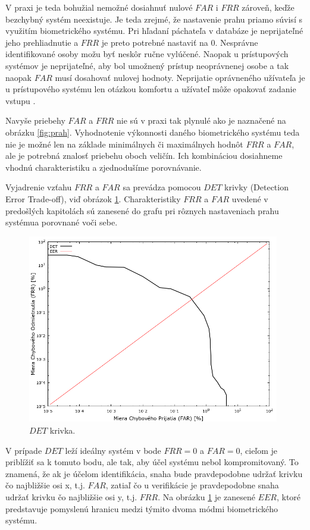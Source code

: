V praxi je teda bohužial nemožné dosiahnuť nulové $FAR$ i $FRR$ zároveň, keďže bezchybný systém neexistuje. Je teda zrejmé, že nastavenie prahu priamo súvisí s využitím biometrického systému. Pri hľadaní páchateľa v databáze je neprijateľné jeho prehliadnutie a $FRR$ je preto potrebné nastaviť na 0. Nesprávne identifikované osoby možu byť neskôr ručne vylúčené. Naopak u prístupových systémov je neprijateľné, aby bol umožnený prístup neoprávnenej osobe a tak naopak $FAR$ musí dosahovať nulovej hodnoty. Neprijatie oprávneného užívateľa je u prístupového systému len otázkou komfortu a užívateľ môže opakovať zadanie vstupu \cite{bio3}.

Navyše priebehy $FAR$ a $FRR$ nie sú v praxi tak plynulé ako je naznačené na obrázku \ref{fig:prah}. Vyhodnotenie výkonnosti daného biometrického systému teda nie je možné len na základe minimálnych či maximálnych hodnôt $FRR$ a $FAR$, ale je potrebná znalosť priebehu oboch veličín. Ich kombináciou dosiahneme vhodnú charakteristiku a zjednodušíme porovnávanie.

Vyjadrenie vzťahu $FRR$ a $FAR$ sa prevádza pomocou $DET$ krivky (Detection Error Trade-off), viď obrázok \ref{fig:det}. Charakteristiky $FRR$ a $FAR$ uvedené v predošlých kapitolách sú zanesené do grafu pri rôznych nastaveniach prahu systémua porovnané voči sebe.

\begin{figure}[!ht]
	\centering
	\includegraphics[width=11cm]{img/det.png}
	\caption{$DET$ krivka\cite{bio}.}
	\label{fig:det}
\end{figure}

V prípade $DET$ leží ideálny systém v bode $FRR = 0$ a $FAR = 0$, cieľom je priblížiť sa k tomuto bodu, ale tak, aby účel systému nebol kompromitovaný. To znamená, že ak je účelom identifikácia, snaha bude pravdepodobne udržať krivku čo najbližšie osi x, t.j. $FAR$, zatiaľ čo u verifikácie je pravdepodobne snaha udržať krivku čo najbližšie osi y, t.j. $FRR$.
Na obrázku \ref{fig:det} je zanesené $EER$, ktoré predstavuje pomyslenú hranicu medzi týmito dvoma módmi biometrického systému.

